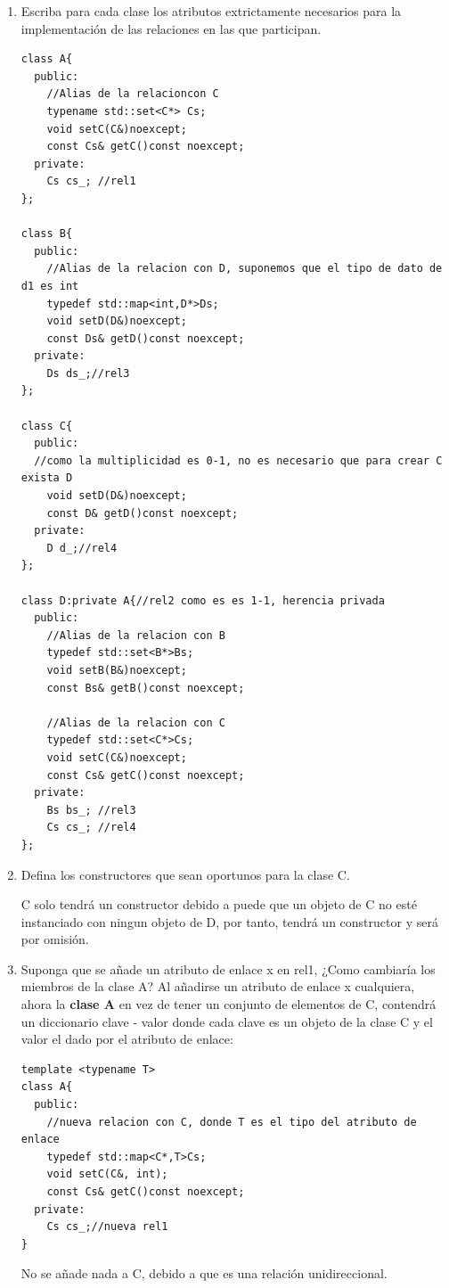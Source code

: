 \begin{enumerate}[label = \alph*)]
    \item Escriba para cada clase los atributos extrictamente necesarios para la implementación de las relaciones en las que participan.
\begin{verbatim}
class A{
  public:
    //Alias de la relacioncon C
    typename std::set<C*> Cs;
    void setC(C&)noexcept;
    const Cs& getC()const noexcept;
  private:
    Cs cs_; //rel1
};

class B{
  public:
    //Alias de la relacion con D, suponemos que el tipo de dato de d1 es int
    typedef std::map<int,D*>Ds;
    void setD(D&)noexcept;
    const Ds& getD()const noexcept;
  private:
    Ds ds_;//rel3
};

class C{  
  public:
  //como la multiplicidad es 0-1, no es necesario que para crear C exista D
    void setD(D&)noexcept;
    const D& getD()const noexcept;
  private:
    D d_;//rel4
};

class D:private A{//rel2 como es es 1-1, herencia privada
  public:
    //Alias de la relacion con B
    typedef std::set<B*>Bs;
    void setB(B&)noexcept;
    const Bs& getB()const noexcept;

    //Alias de la relacion con C
    typedef std::set<C*>Cs;
    void setC(C&)noexcept;
    const Cs& getC()const noexcept;
  private:
    Bs bs_; //rel3
    Cs cs_; //rel4
};
\end{verbatim}
    \item Defina los constructores que sean oportunos para la clase C.

    C solo tendrá un constructor debido a puede que un objeto de C no esté instanciado con ningun objeto de D, por tanto, tendrá un constructor y será por omisión.
    \item Suponga que se añade un atributo de enlace x en rel1, ¿Como cambiaría los miembros de la clase A?
    Al añadirse un atributo de enlace x cualquiera, ahora la \textbf{clase A} en vez de tener un conjunto de elementos de C, contendrá un diccionario clave - valor donde cada clave es un objeto de la clase C y el valor el dado por el atributo de enlace:
\begin{verbatim}
template <typename T>
class A{
  public:
    //nueva relacion con C, donde T es el tipo del atributo de enlace
    typedef std::map<C*,T>Cs;
    void setC(C&, int);
    const Cs& getC()const noexcept;
  private:
    Cs cs_;//nueva rel1 
}
\end{verbatim}
No se añade nada a C, debido a que es una relación unidireccional.
\end{enumerate}

